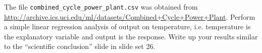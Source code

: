 \item The file {\tt combined\_cycle\_power\_plant.csv} was obtained from 
\url{http://archive.ics.uci.edu/ml/datasets/Combined+Cycle+Power+Plant}. 
Perform a simple linear regression analysis of output on temperature, 
i.e. temperature is the explanatory variable and output is the response. 
Write up your results similar to the ``scientific conclusion'' slide in slide 
set 26.
